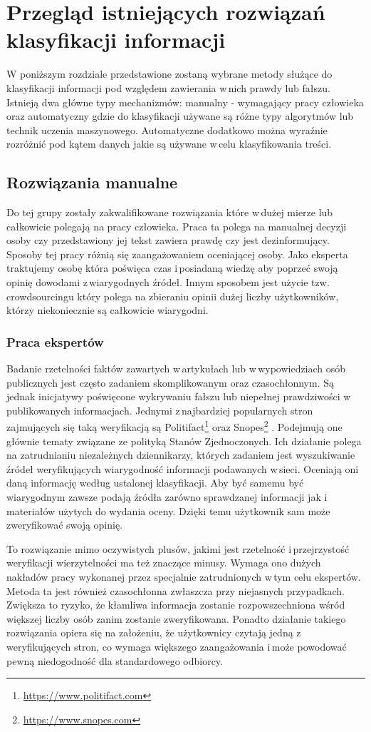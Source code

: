 \newpage %
\section{Przegląd istniejących rozwiązań klasyfikacji informacji}
W poniższym rozdziale przedstawione zostaną wybrane metody służące do klasyfikacji informacji pod względem zawierania w\,nich prawdy lub fałszu. Istnieją dwa główne typy mechanizmów: manualny - wymagający pracy człowieka oraz automatyczny gdzie do klasyfikacji używane są różne typy algorytmów lub technik uczenia maszynowego. Automatyczne dodatkowo można wyraźnie rozróżnić pod kątem danych jakie są używane w\,celu klasyfikowania treści. 
\subsection{Rozwiązania manualne} \label{rozwiazania-manualne}
Do tej grupy zostały zakwalifikowane rozwiązania które w\,dużej mierze lub całkowicie polegają na pracy człowieka. Praca ta polega na manualnej decyzji osoby czy przedstawiony jej tekst zawiera prawdę czy jest dezinformujący. Sposoby tej pracy różnią się zaangażowaniem oceniającej osoby. Jako eksperta traktujemy osobę która poświęca czas i\,posiadaną wiedzę aby poprzeć swoją opinię dowodami z\,wiarygodnych źródeł. Innym sposobem jest użycie tzw. crowdsourcingu który polega na zbieraniu opinii dużej liczby użytkowników, którzy niekoniecznie są całkowicie wiarygodni. 
\subsubsection{Praca ekspertów}
Badanie rzetelności faktów zawartych w\,artykułach lub w\,wypowiedziach osób publicznych jest często zadaniem skomplikowanym oraz czasochłonnym. Są jednak inicjatywy poświęcone wykrywaniu fałszu lub niepełnej prawdziwości w\,publikowanych informacjach. Jednymi z\,najbardziej popularnych stron zajmujących się taką weryfikacją są Politifact\footnote{\url{https://www.politifact.com}} oraz Snopes\footnote{\url{https://www.snopes.com}} . Podejmują one głównie tematy związane ze polityką Stanów Zjednoczonych. Ich działanie polega na zatrudnianiu niezależnych dziennikarzy, których zadaniem jest wyszukiwanie źródeł weryfikujących wiarygodność informacji podawanych w\,sieci. Oceniają oni daną informację według ustalonej klasyfikacji. Aby być samemu być wiarygodnym zawsze podają źródła zarówno sprawdzanej informacji jak i\,materiałów użytych do wydania oceny. Dzięki temu użytkownik sam może zweryfikować swoją opinię. 
\par To rozwiązanie mimo oczywistych plusów, jakimi jest rzetelność i\,przejrzystość weryfikacji wierzytelności ma też znaczące minusy. Wymaga ono dużych nakładów pracy wykonanej przez specjalnie zatrudnionych w\,tym celu ekspertów. Metoda ta jest również czasochłonna zwłaszcza przy niejasnych przypadkach. Zwiększa to ryzyko, że kłamliwa informacja zostanie rozpowszechniona wśród większej liczby osób zanim zostanie zweryfikowana. Ponadto działanie takiego rozwiązania opiera się na założeniu, że użytkownicy czytają jedną z\,weryfikujących stron, co wymaga większego zaangażowania i\,może powodować pewną niedogodność dla standardowego odbiorcy. 
